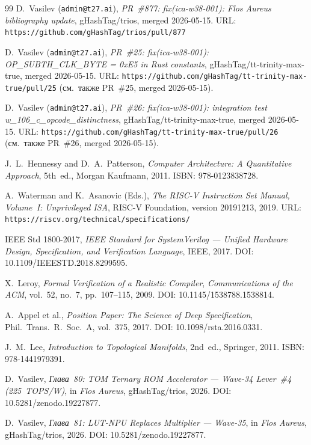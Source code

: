 \begin{thebibliography}{99}
D.~Vasilev (\texttt{admin@t27.ai}),
\emph{PR~\#877: fix(ica-w38-001): Flos Aureus bibliography update},
gHashTag/trios, merged 2026-05-15.
URL: \texttt{https://github.com/gHashTag/trios/pull/877}

D.~Vasilev (\texttt{admin@t27.ai}),
\emph{PR~\#25: fix(ica-w38-001): OP\_SUBTH\_CLK\_BYTE = 0xE5 in Rust constants},
gHashTag/tt-trinity-max-true, merged 2026-05-15.
URL: \texttt{https://github.com/gHashTag/tt-trinity-max-true/pull/25}
(см.\ также PR~\#25, merged 2026-05-15).

D.~Vasilev (\texttt{admin@t27.ai}),
\emph{PR~\#26: fix(ica-w38-001): integration test w\_106\_c\_opcode\_distinctness},
gHashTag/tt-trinity-max-true, merged 2026-05-15.
URL: \texttt{https://github.com/gHashTag/tt-trinity-max-true/pull/26}
(см.\ также PR~\#26, merged 2026-05-15).

J.~L.~Hennessy and D.~A.~Patterson,
\emph{Computer Architecture: A Quantitative Approach}, 5th~ed.,
Morgan Kaufmann, 2011.
ISBN: 978-0123838728.

A.~Waterman and K.~Asanovic (Eds.),
\emph{The RISC-V Instruction Set Manual, Volume~I: Unprivileged ISA},
RISC-V Foundation, version 20191213, 2019.
URL: \texttt{https://riscv.org/technical/specifications/}

IEEE Std 1800-2017,
\emph{IEEE Standard for SystemVerilog — Unified Hardware Design,
Specification, and Verification Language},
IEEE, 2017.
DOI: 10.1109/IEEESTD.2018.8299595.

X.~Leroy,
\emph{Formal Verification of a Realistic Compiler},
\emph{Communications of the ACM}, vol.~52, no.~7, pp.~107--115, 2009.
DOI: 10.1145/1538788.1538814.

A.~Appel et al.,
\emph{Position Paper: The Science of Deep Specification},
Phil.\ Trans.\ R.\ Soc.\ A, vol.~375, 2017.
DOI: 10.1098/rsta.2016.0331.

J.~M.~Lee,
\emph{Introduction to Topological Manifolds}, 2nd~ed.,
Springer, 2011.
ISBN: 978-1441979391.

D.~Vasilev,
\emph{Глава~80: TOM Ternary ROM Accelerator — Wave-34 Lever~\#4 (225~TOPS/W)},
in \emph{Flos Aureus}, gHashTag/trios, 2026.
DOI: 10.5281/zenodo.19227877.

D.~Vasilev,
\emph{Глава~81: LUT-NPU Replaces Multiplier — Wave-35},
in \emph{Flos Aureus}, gHashTag/trios, 2026.
DOI: 10.5281/zenodo.19227877.


\end{thebibliography}
